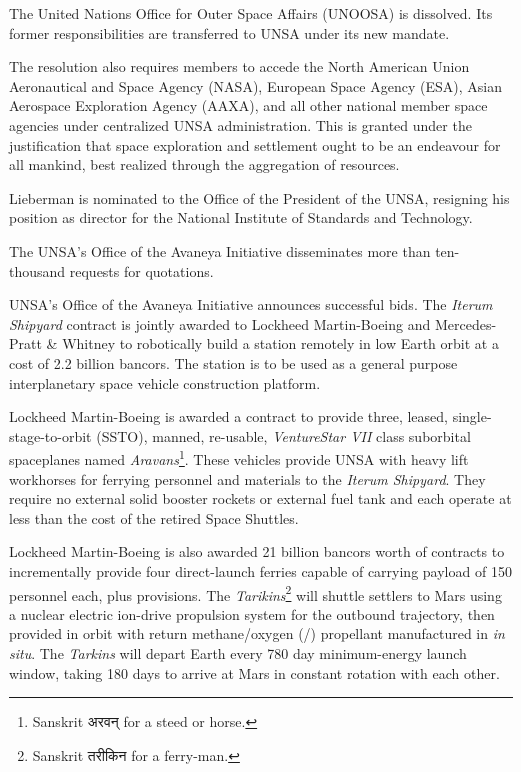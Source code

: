 The United Nations Office for Outer Space Affairs (UNOOSA) is dissolved. Its former responsibilities are transferred to UNSA under its new mandate.

The resolution also requires members to accede the North American Union Aeronautical and Space Agency (NASA), European Space Agency (ESA), Asian Aerospace Exploration Agency (AAXA), and all other national member space agencies under centralized UNSA administration. This is granted under the justification that space exploration and settlement ought to be an endeavour for all mankind, best realized through the aggregation of resources.

Lieberman is nominated to the Office of the President of the UNSA, resigning his position as director for the National Institute of Standards and Technology.
\StopTimelineDate

The UNSA's Office of the Avaneya Initiative disseminates more than ten-thousand requests for quotations.
\StopTimelineDate

UNSA's Office of the Avaneya Initiative announces successful bids. The {\it Iterum Shipyard} contract is jointly awarded to Lockheed Martin-Boeing and Mercedes-Pratt & Whitney to robotically build a station remotely in low Earth orbit at a cost of 2.2 billion bancors. The station is to be used as a general purpose interplanetary space vehicle construction platform.

Lockheed Martin-Boeing is awarded a contract to provide three, leased, single-stage-to-orbit (SSTO), manned, re-usable, {\it VentureStar VII} class suborbital spaceplanes named {\it Aravans}\footnote{Sanskrit अरवन् for a steed or horse.}. These vehicles provide UNSA with heavy lift workhorses for ferrying personnel and materials to the {\it Iterum Shipyard}. They require no external solid booster rockets or external fuel tank and each operate at less than  the cost of the retired Space Shuttles.

Lockheed Martin-Boeing is also awarded 21 billion bancors worth of contracts to incrementally provide four direct-launch ferries capable of carrying payload of 150 personnel each, plus provisions. The {\it Tarikins}\footnote{Sanskrit तरीकिन for a ferry-man.} will shuttle settlers to Mars using a nuclear electric ion-drive propulsion system for the outbound trajectory, then provided in orbit with return methane/oxygen (/) propellant manufactured in {\it in situ}. The {\it Tarkins} will depart Earth every 780 day minimum-energy launch window, taking 180 days to arrive at Mars in constant rotation with each other.

